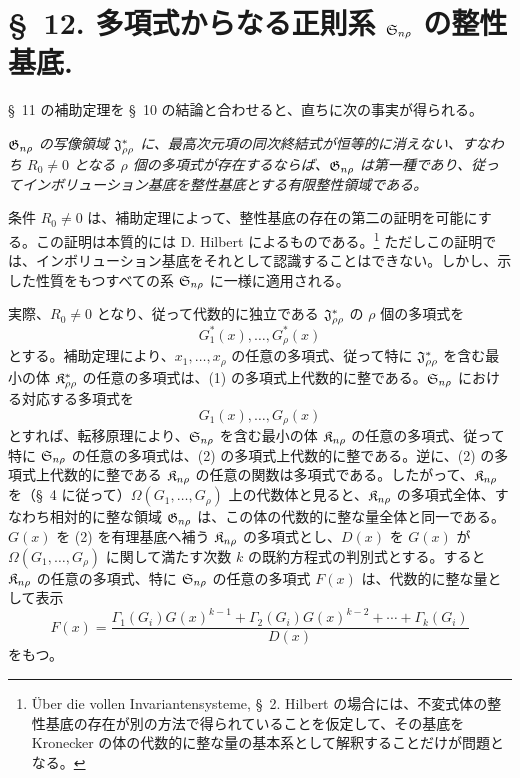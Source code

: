 \documentclass[11pt]{article}
\begin{document}
\section*{\S\ 12. 多項式からなる正則系 $\mathfrak{S}_{n\rho}$ の整性基底.}

\S\ 11 の補助定理を \S\ 10 の結論と合わせると、直ちに次の事実が得られる。

\emph{$\mathfrak{G}_{n\rho}$ の写像領域 $\mathfrak{J}^*_{\rho\rho}$ に、最高次元項の同次終結式が恒等的に消えない、すなわち $R_0\ne0$ となる $\rho$ 個の多項式が存在するならば、$\mathfrak{G}_{n\rho}$ は第一種であり、従ってインボリューション基底を整性基底とする有限整性領域である。}

条件 $R_0\ne0$ は、補助定理によって、整性基底の存在の第二の証明を可能にする。この証明は本質的には D. Hilbert によるものである。\footnote{Über die vollen Invariantensysteme, \S\ 2. Hilbert の場合には、不変式体の整性基底の存在が別の方法で得られていることを仮定して、その基底を Kronecker の体の代数的に整な量の基本系として解釈することだけが問題となる。} ただしこの証明では、インボリューション基底をそれとして認識することはできない。しかし、示した性質をもつすべての系 $\mathfrak{S}_{n\rho}$ に一様に適用される。

実際、$R_0\ne0$ となり、従って代数的に独立である $\mathfrak{J}^*_{\rho\rho}$ の $\rho$ 個の多項式を
\begin{equation}
  G_1^*(x),\ldots,G_\rho^*(x)
\tag{1}
\end{equation}
とする。補助定理により、$x_1,\ldots,x_\rho$ の任意の多項式、従って特に $\mathfrak{J}^*_{\rho\rho}$ を含む最小の体 $\mathfrak{K}^*_{\rho\rho}$ の任意の多項式は、(1) の多項式上代数的に整である。$\mathfrak{S}_{n\rho}$ における対応する多項式を
\begin{equation}
  G_1(x),\ldots,G_\rho(x)
\tag{2}
\end{equation}
とすれば、転移原理により、$\mathfrak{S}_{n\rho}$ を含む最小の体 $\mathfrak{K}_{n\rho}$ の任意の多項式、従って特に $\mathfrak{S}_{n\rho}$ の任意の多項式は、(2) の多項式上代数的に整である。逆に、(2) の多項式上代数的に整である $\mathfrak{K}_{n\rho}$ の任意の関数は多項式である。したがって、$\mathfrak{K}_{n\rho}$ を（\S\ 4 に従って）$\Omega(G_1,\ldots,G_\rho)$ 上の代数体と見ると、$\mathfrak{K}_{n\rho}$ の多項式全体、すなわち相対的に整な領域 $\mathfrak{G}_{n\rho}$ は、この体の代数的に整な量全体と同一である。$G(x)$ を (2) を有理基底へ補う $\mathfrak{K}_{n\rho}$ の多項式とし、$D(x)$ を $G(x)$ が $\Omega(G_1,\ldots,G_\rho)$ に関して満たす次数 $k$ の既約方程式の判別式とする。すると $\mathfrak{K}_{n\rho}$ の任意の多項式、特に $\mathfrak{S}_{n\rho}$ の任意の多項式 $F(x)$ は、代数的に整な量として表示
\begin{equation}
  F(x)=\frac{\Gamma_1(G_i)G(x)^{k-1}+\Gamma_2(G_i)G(x)^{k-2}+\cdots+\Gamma_k(G_i)}{D(x)}
\tag{3}
\end{equation}
をもつ。
\end{document}
